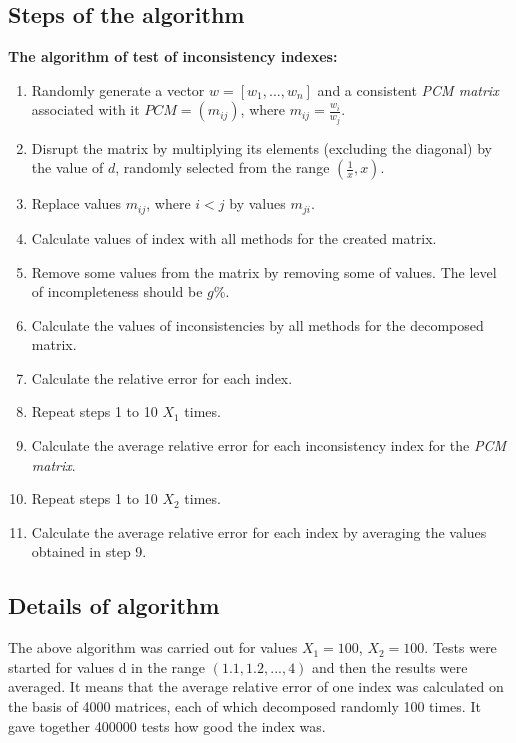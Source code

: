 \subsection{Steps of the algorithm}
\textbf{The algorithm of test of inconsistency indexes:}
\begin{enumerate}
\item Randomly generate a vector $w=[w_{1},...,w_{n}]$ and a consistent \textit{PCM matrix} associated with it $PCM=\left(m_{ij}\right)$, where $m_{ij}=\frac{w_{i}}{w_{j}}$.
\item Disrupt the matrix by multiplying its elements (excluding the diagonal) by the value of $d$, randomly selected from the range $\left(\frac{1}{x},x\right)$.
\item Replace values $m_{ij}$, where $i<j$ by values $m_{ji}$.

\item Calculate values of index with all methods for the created matrix.

\item Remove some values from the matrix by removing some of values. The level of incompleteness should be $g$\%.

\item Calculate the values of inconsistencies by all methods for the decomposed matrix.

\item Calculate the relative error for each index.

\item Repeat steps 1 to 10 $X_{1}$ times.

\item Calculate the average relative error for each inconsistency index for the \textit{PCM matrix}.

\item Repeat steps 1 to 10 $X_{2}$ times.

\item Calculate the average relative error for each index by averaging the values obtained in step 9.

\end{enumerate}


\subsection{Details of algorithm}
The above algorithm was carried out for values $X_{1}=100$, $X_{2}=100$. Tests were started for values d in the range $\left(1.1,1.2,...,4\right)$ and then the results were averaged. It means that the average relative error of one index was calculated on the basis of 4000 matrices, each of which decomposed randomly 100 times. It gave together 400000 tests how good the index was. 
\\

